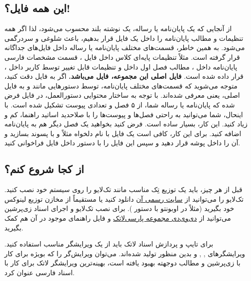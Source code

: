 \subsection{این همه فایل؟!}
\label{muchFiles}
از آنجایی که یک پایان‌نامه یا رساله، یک نوشته بلند محسوب می‌شود، لذا اگر همه تنظیمات و مطالب پایان‌نامه را داخل یک فایل قرار بدهیم، باعث شلوغی و سردرگمی می‌شود. به همین خاطر، قسمت‌های مختلف پایان‌نامه یا رساله  داخل فایل‌های جداگانه قرار گرفته است. مثلاً تنظیمات پایه‌ای کلاس داخل فایل
، 
قسمت مشخصات فارسی پایان‌نامه داخل 
،
مطالب فصل اول داخل 
و تنظیمات قابل تغییر توسط کاربر داخل 
،
قرار داده شده است.
\textbf{
	فایل اصلی این مجموعه، فایل
	می‌باشد.
}
اگر به فایل 
دقت کنید، متوجه می‌شوید که قسمت‌های مختلف پایان‌نامه، توسط دستورهایی مانند 
و
به فایل اصلی، یعنی 
معرفی شده‌اند.
با توجه به ساختار محتوایی دستورالعمل، در فایل
فرض شده که پایان‌نامه یا رساله شما، از ۵ فصل و تعدادی پیوست تشکیل شده است. با اینحال، شما می‌توانید به راحتی فصل‌ها و پیوست‌ها را با صلاحدید اساتید راهنما، کم و زیاد کنید. این کار، بسیار ساده است. فرض کنید بخواهید یک فصل دیگر هم به پایان‌نامه اضافه کنید. برای این کار، کافی است یک فایل با نام دلخواه مثلاً 
و با پسوند 
بسازید و آن را داخل پوشه 
قرار دهید و سپس این فایل را با دستور 
\verb!!
داخل فایل
 فراخوانی کنید.

\subsection{از کجا شروع کنم؟}
قبل از هر چیز، باید یک توزیع تِک مناسب مانند تک‌لایو
را روی سیستم خود نصب کنید. تک‌لایو  را می‌توانید از 
 \href{http://www.tug.org/texlive}{سایت رسمی آن}%
 دانلود کنید یا مستقیماً از مخازن توزیع لینوکس خود بگیرید (مثلاً در اوبونتو با دستور
).
برای نصب تک‌لایو و اجرای اسناد زی‌پرشین می‌توانید از
\href{http://parsilatex.com/site/shop/}{دی‌وی‌دی مجموعه پارسی‌لاتک}%
و فایل راهنمای موجود در آن هم کمک بگیرید.

برای تایپ و پردازش اسناد لاتک باید از یک ویرایشگر مناسب استفاده کنید. ویرایشگرهای
,
,
و
بدین منظور تولید شده‌اند. می‌توان ویرایش‌گر 
 \href{https://bitbucket.org/srazi/biditexmaker3}{}%
را که بویژه برای کار با زی‌پرشین و مطالب دوجهته بهبود یافته است، بهینه‌ترین ویرایشگر لاتک برای کار با اسناد فارسی عنوان کرد.
 
